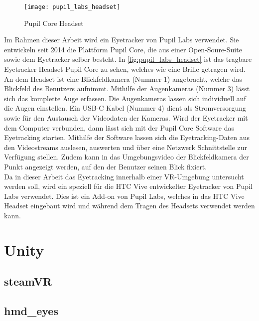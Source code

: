 \begin{figure}[!htbp]
	\centering
	\texttt{[image: pupil\_labs\_headset]}
	\caption{Pupil Core Headset}
	\label{fig:pupil_labs_headset}
\end{figure}


Im Rahmen dieser Arbeit wird ein Eyetracker von Pupil Labs verwendet. Sie entwickeln seit 2014 die Plattform Pupil Core, die aus einer Open-Soure-Suite sowie dem Eyetracker selber besteht. In \autoref{fig:pupil_labs_headset} ist das tragbare Eyetracker Headset Pupil Core zu sehen, welches wie eine Brille getragen wird. An dem Headset ist eine Blickfeldkamera (Nummer 1) angebracht, welche das Blickfeld des Benutzers aufnimmt. Mithilfe der Augenkameras (Nummer 3) lässt sich das komplette Auge erfassen. Die Augenkameras lassen sich individuell auf die Augen einstellen. Ein USB-C Kabel (Nummer 4) dient als Stromversorgung sowie für den Austausch der Videodaten der Kameras. Wird der Eyetracker mit dem Computer verbunden, dann lässt sich mit der Pupil Core Software das Eyetracking starten. Mithilfe der Software lassen sich die Eyetracking-Daten aus den Videostreams auslesen, auswerten und über eine Netzwerk Schnittstelle zur Verfügung stellen. Zudem kann in das Umgebungsvideo der Blickfeldkamera der Punkt angezeigt werden, auf den der Benutzer seinen Blick fixiert. \\
Da in dieser Arbeit das Eyetracking innerhalb einer \ac{VR}-Umgebung untersucht werden soll, wird ein speziell für die HTC Vive entwickelter Eyetracker von Pupil Labs verwendet. Dies ist ein Add-on von Pupil Labs, welches in das HTC Vive Headset eingebaut wird und während dem Tragen des Headsets verwendet werden kann.


\cite{PaperPupilLabs}

\section{Unity}

\subsection{steamVR}

\subsection{hmd\_eyes}
